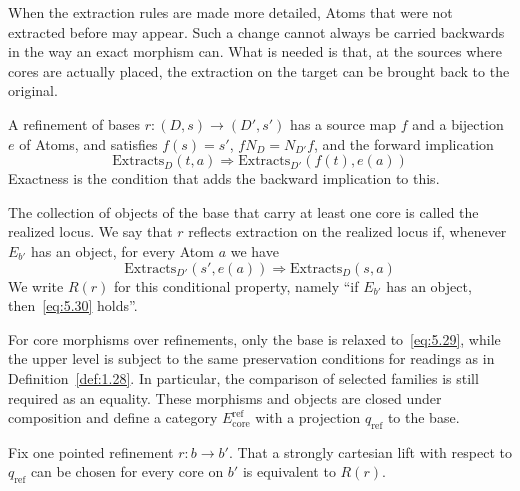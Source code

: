 When the extraction rules are made more detailed, Atoms that were not extracted before may
appear. Such a change cannot always be carried backwards in the way an exact morphism can.
What is needed is that, at the sources where cores are actually placed, the extraction on
the target can be brought back to the original.

\begin{definition}\label{def:5.24}

A refinement of bases $r:(D,s)\to(D',s')$ has a source map $f$ and a bijection $e$ of
Atoms, and satisfies $f(s)=s'$, $fN_D=N_{D'}f$, and the forward implication
\begin{equation*}
\mathrm{Extracts}_D(t,a)
\Longrightarrow\mathrm{Extracts}_{D'}(f(t),e(a))
\tag{5.29}\label{eq:5.29}
\end{equation*}
Exactness is the condition that adds the backward implication to this.

The collection of objects of the base that carry at least one core is called the realized
locus. We say that $r$ reflects extraction on the realized locus if, whenever $E_{b'}$ has
an object, for every Atom $a$ we have
\begin{equation*}
\mathrm{Extracts}_{D'}(s',e(a))
\Longrightarrow\mathrm{Extracts}_D(s,a)
\tag{5.30}\label{eq:5.30}
\end{equation*}
We write $R(r)$ for this conditional property, namely ``if $E_{b'}$ has an object,
then~\eqref{eq:5.30} holds''.

For core morphisms over refinements, only the base is relaxed to~\eqref{eq:5.29}, while the
upper level is subject to the same preservation conditions for readings as in
Definition~\ref{def:1.28}. In particular, the comparison of selected families is still
required as an equality. These morphisms and objects are closed under composition and
define a category $E_{\mathrm{core}}^{\mathrm{ref}}$ with a projection $q_{\mathrm{ref}}$
to the base.

\end{definition}

\begin{theorem}\label{thm:5.25}

Fix one pointed refinement $r:b\to b'$. That a strongly cartesian lift with respect to
$q_{\mathrm{ref}}$ can be chosen for every core on $b'$ is equivalent to $R(r)$.

\end{theorem}

